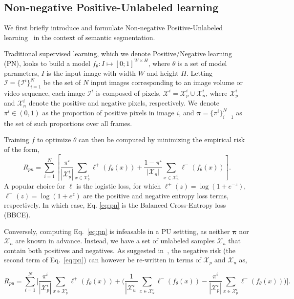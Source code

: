 
\subsection{Non-negative Positive-Unlabeled learning}
\label{sec:nnpu}

We first briefly introduce and formulate Non-negative Positive-Unlabeled learning~\cite{kiryo17} in the context of semantic segmentation.

Traditional supervised learning, which we denote Positive/Negative learning (PN), looks to build a model \(f_{\theta}: I \mapsto [0;1]^{W \times H}\), where \(\theta\) is a set of model parameters, \(I\) is the input image with width $W$ and height $H$. Letting \(\bm{\mathcal{I}} = \{\mathcal{I}^i\}_{i=1}^{N}\) be the set of $N$ input images corresponding to an image volume or video sequence, 
each image $\mathcal{I}^i$ is composed of pixels, $\mathcal{X}^i=\mathcal{X}_p^i \cup \mathcal{X}_n^i$, where $\mathcal{X}_p^i$ and $\mathcal{X}_n^i$ denote the positive and negative pixels, respectively. We denote $\pi^i \in (0,1)$ as the proportion of positive pixels in image $i$, and $\bm{\pi} = \{\pi^i\}_{i=1}^{N}$ as the set of such proportions over all frames. 

Training $f$ to optimize $\theta$ can then be computed by minimizing the empirical risk of the form,
\begin{equation}
R_{pn}=\sum_{i=1}^{N} \left[ \frac{\pi^i}{|\mathcal{X}_p^i|}\sum_{x \in \mathcal{X}_p^i}\ell^+(f_{\theta}(x)) \right.+
\left. \frac{1-\pi^i}{|\mathcal{X}_n|} \sum_{x \in \mathcal{X}_n^i}\ell^-(f_{\theta}(x)) \right].
  \label{eq:pn}
\end{equation}
\noindent 
A popular choice for $\ell$ is the logistic loss, for which \(\ell^+(z)=\log(1+ e^{-z})\), \(\ell^-(z)=\log(1+e^{z})\) are the positive and negative entropy loss terms, respectively. In which case, Eq. \eqref{eq:pn} is the Balanced Cross-Entropy loss (BBCE).

Conversely, computing Eq.~\eqref{eq:pn} is infeasable in a PU settting, as neither $\bm{\pi}$ nor $\bm{\mathcal{X}}_{n}$ are known in advance. Instead, we have a set of unlabeled samples $\bm{\mathcal{X}}_{u}$ that contain both positives and negatives. As suggested in~\cite{duplessis15}, the negative risk (\ie the second term of Eq.~\eqref{eq:pn}) can however be re-written in terms of $\bm{\mathcal{X}}_{p}$ and $\bm{\mathcal{X}}_{u}$ as,

\begin{equation}
  \label{eq:nnpu}
R_{pu}=\sum_{i=1}^{N}\Biggl[ \frac{\pi^{i}}{|\mathcal{X}^{i}_{p}|}\sum_{x \in \mathcal{X}^{i}_p}\ell^+(f_{\theta}(x)) +
\Biggl( \frac{1}{|\mathcal{X}^{i}_{u}|}\sum_{x \in \mathcal{X}^{i}_u}\ell^-(f_{\theta}(x)) -
\frac{\pi^{i}}{|\mathcal{X}^{i}_{p}|}\sum_{x \in \mathcal{X}^{i}_p}\ell^-(f_{\theta}(x)) \Biggr) \Biggr].
\end{equation}

